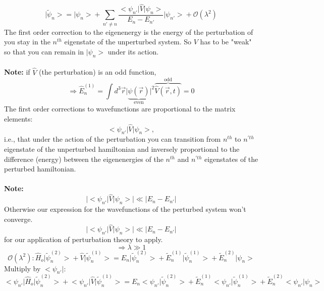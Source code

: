 \documentclass[12pt,fancychapters]{report}
\numberwithin{equation}{section}
\begin{document}
\begin{equation*}
	\big| \tilde{\psi}_n \big> = \big| \psi_n \big> +\sum_{n' \neq n}
	\frac{\big< \psi_{n'}\big|\hat{V}\big|\psi_n\big>}{E_n - E_{n'}}\big|\psi_{n'}\big> + \mathcal{O}(\lambda^2)
\end{equation*}
The first order correction to the eigenenergy is the energy of the perturbation of you stay in the
$n^{th}$ eigenstate of the unperturbed system. So $V$ has to be "weak" so that you can remain in
$\big|\psi_n\big>$ under its action.\\
\\
\textbf{Note:} if $\hat{V}$ (the perturbation) is an odd function,
\begin{equation*}
	\Longrightarrow \hat{E}^{(1)}_n = \int d^3 \vec{r}\big|\underbrace{\psi(\vec{r})}_\text{even}
	\big|^2 \overbrace{\hat{V}(\vec{r}, t)}^\text{odd} = 0
\end{equation*}
The first order corrections to wavefunctions are proportional to the matrix elements: 
$$\big<\psi_{n'}\big|\hat{V}\big|\psi_n\big>,$$
i.e., that under the action of the perturbation you can transition from $n^{th}$ to $n^{'th}$ 
eigenstate of the unperturbed hamiltonian and inversely proportional to the difference (energy)
between the eigenenergies of the $n^{th}$ and $n^{'th}$  eigenstates of the perturbed hamiltonian.\\
\\
\textbf{Note:}
\begin{equation*}
	\big|\big<\psi_{n'} \big| \hat{V}\big| \psi_n \big> \big| \ll \big|E_n - E_{n'}\big|
\end{equation*}
Otherwise our expression for the wavefunctions of the perturbed system won't converge.
$$	\big|\big<\psi_{n'} \big| \hat{V}\big| \psi_n \big> \big| \ll \big|E_n - E_{n'}\big|$$ 
for our application of perturbation theory to apply.
$$\Longrightarrow \lambda \gg 1$$
\begin{equation*}
	\mathcal{O}(\lambda ^2): \hat{H}_o \big|\tilde{\psi}^{(2)}_n\big> + \hat{V}\big|\tilde{\psi}^{(1)}_n\big>
	= E_n \big|\tilde{\psi}^{(2)}_n \big> + \tilde{E}^{(1)}_n \big|\tilde{\psi}^{(1)}_n \big>
	+ \tilde{E}^{(2)}_n \big| \psi_n \big>
\end{equation*}
Multiply by $\big< \psi_{n'} \big|$:
\begin{equation*}
	\big< \psi_{n'} \big|\hat{H}_o \big|\tilde{\psi}^{(2)}_n\big> + 
	\big< \psi_{n'} \big|\hat{V}\big|\tilde{\psi}^{(1)}_n\big>
	= E_n \big< \psi_{n'} \big|\tilde{\psi}^{(2)}_n \big> + 
	\tilde{E}^{(1)}_n \big< \psi_{n'} \big|\tilde{\psi}^{(1)}_n \big>
	+ \tilde{E}^{(2)}_n \big< \psi_{n'} \big| \psi_n \big>	
\end{equation*}
\end{document}
